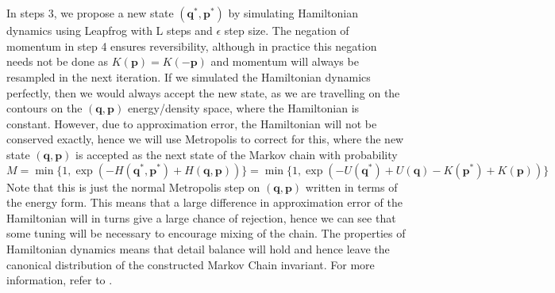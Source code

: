 \documentclass[11pt]{article}
\begin{document}
\\
\\
In steps 3, we propose a new state $(\mathbf{q^{*}},\mathbf{p^{*}})$ by simulating Hamiltonian dynamics using Leapfrog with L steps and $\epsilon$ step size. The negation of momentum in step 4 ensures reversibility, although in practice this negation needs not be done as $K(\mathbf{p})=K(-\mathbf{p})$ and momentum will always be resampled in the next iteration. If we simulated the Hamiltonian dynamics perfectly, then we would always accept the new state, as we are travelling on the contours on the $(\mathbf{q},\mathbf{p})$ energy/density space, where the Hamiltonian is constant. However, due to approximation error, the Hamiltonian will not be conserved exactly, hence we will use Metropolis to correct for this, where the new state $(\mathbf{q},\mathbf{p})$ is accepted as the next state of the Markov chain with probability
\begin{equation}
M=\min \{1,\exp(-H(\mathbf{q^{*}},\mathbf{p^{*}})+H(\mathbf{q},\mathbf{p}))\} = \min\{1, \exp(-U(\mathbf{q^{*}})+U(\mathbf{q})-K(\mathbf{p^{*}})+K(\mathbf{p}))\}
\end{equation}
Note that this is just the normal Metropolis step on $(\mathbf{q},\mathbf{p})$ written in terms of the energy form. This means that a large difference in approximation error of the Hamiltonian  will in turns give a large chance of rejection, hence we can see that some tuning will be necessary to encourage mixing of the chain. The properties of Hamiltonian dynamics means that detail balance will hold and hence leave the canonical distribution of the constructed Markov Chain invariant. For more information, refer to \cite{neal}.
\end{document}
